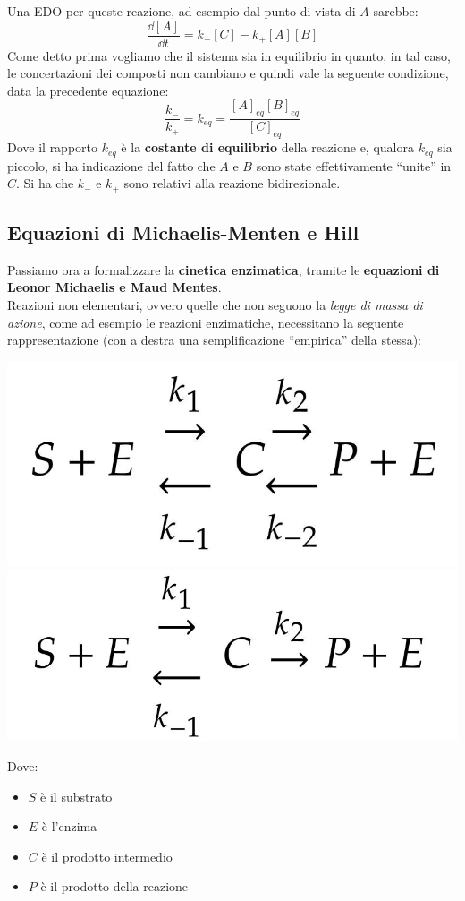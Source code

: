 \documentclass[a4paper,12pt, oneside]{book}
\begin{document}
Una EDO per queste reazione, ad esempio dal punto di vista di $A$ sarebbe:
\[\frac{\dd{[A]}}{\dd{t}}=k_-[C]-k_+[A][B]\]
Come detto prima vogliamo che il sistema sia in equilibrio in quanto, in tal
caso, le concertazioni dei composti non cambiano e quindi vale la seguente
condizione, data la precedente equazione:
\[\frac{k_-}{k_+}=k_{eq}=\frac{[A]_{eq}[B]_{eq}}{[C]_{eq}}\]
Dove il rapporto $k_{eq}$ è la \textbf{costante di equilibrio} della reazione e,
qualora $k_{eq}$ sia piccolo, si ha indicazione del fatto che $A$ e $B$ sono
state effettivamente ``unite'' in $C$. Si ha che $k_-$ e $k_+$ sono relativi
alla reazione bidirezionale.
\subsection{Equazioni di Michaelis-Menten e Hill}
Passiamo ora a formalizzare la \textbf{cinetica enzimatica}, tramite le
\textbf{equazioni di Leonor Michaelis e Maud Mentes}.\\
Reazioni non elementari, ovvero quelle che non seguono la \textit{legge di massa
di azione}, come ad esempio le reazioni enzimatiche, necessitano la seguente
rappresentazione (con a destra una semplificazione ``empirica'' della stessa):
\begin{center}
  \includegraphics[scale = 0.13]{img/equ2.jpg}
  \qquad
  \includegraphics[scale = 0.13]{img/equ3.jpg}
\end{center}
Dove:
\begin{itemize}
  \item $S$ è il substrato
  \item $E$ è l'enzima
  \item $C$ è il prodotto intermedio
  \item $P$ è il prodotto della reazione
\end{itemize}
\end{document}
